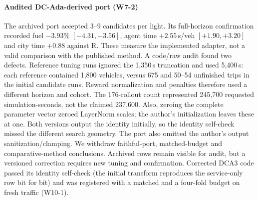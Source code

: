 \paragraph{Audited DC-Ada-derived port (W7-2)}
The archived port accepted 3--9 candidates per light. Its full-horizon confirmation recorded fuel $-3.93\%$ $[-4.31,-3.56]$, agent time $+2.55$\,s/veh $[+1.90,+3.20]$ and city time $+0.88$ against R. These measure the implemented adapter, not a valid comparison with the published method.
A code/raw audit found two defects. Reference tuning runs ignored the 1,350\,s truncation and used 5,400\,s: each reference contained 1,800 vehicles, versus 675 and 50--54 unfinished trips in the initial candidate runs. Reward normalization and penalties therefore used a different horizon and cohort. The 176-rollout count represented 245,700 requested simulation-seconds, not the claimed 237,600. Also, zeroing the complete parameter vector zeroed LayerNorm scales; the author's initialization leaves these at one. Both versions output the identity initially, so the identity self-check missed the different search geometry. The port also omitted the author's output sanitization/clamping.
We withdraw faithful-port, matched-budget and comparative-method conclusions. Archived rows remain visible for audit, but a versioned correction requires new tuning and confirmation. Corrected DCA3 code passed its identity self-check (the initial transform reproduces the service-only row bit for bit) and was registered with a matched and a four-fold budget on fresh traffic (W10-1).

